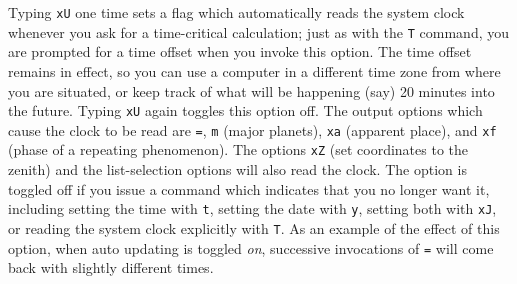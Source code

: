 Typing {\tt xU} one time sets a flag which automatically reads the system
clock whenever you ask for a time-critical calculation; just as with the
{\tt T} command, you are prompted for a time offset when you invoke this
option.  The time offset remains in effect, so you can use a computer
in a different time zone from where you are situated, or keep track of
what will be happening (say) 20 minutes into the future.
Typing {\tt xU} again toggles this option off.  The output options 
which cause the clock to be read are {\tt =}, {\tt m} (major planets), 
{\tt xa} (apparent place), and {\tt xf}
(phase of a repeating phenomenon).  The options {\tt xZ} (set coordinates
to the zenith) and the list-selection options will also read the clock.
The option is toggled off if
you issue a command which indicates that you no longer want it, 
including
setting the time with {\tt t}, setting the date with {\tt y}, setting both
with {\tt xJ}, or reading the system clock explicitly with {\tt T}.
As an example of the effect of this option, when auto updating is toggled
{\it on}, successive
invocations of {\tt =} will come back with slightly different times.



